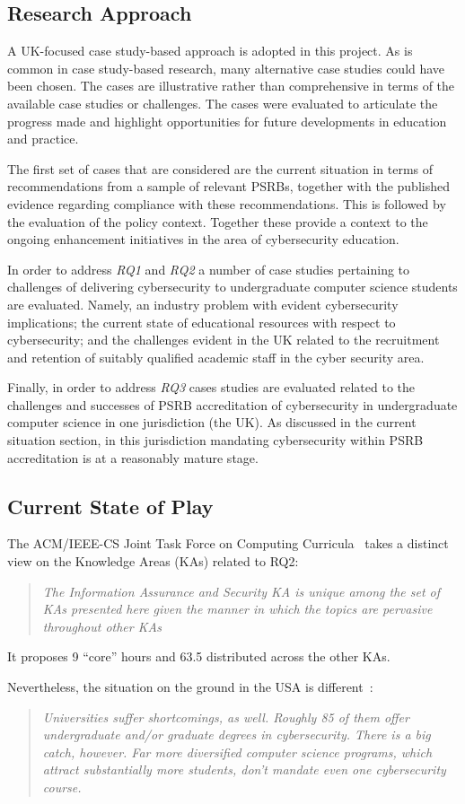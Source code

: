\documentclass[conference]{IEEEtran}
\begin{document}
\subsection{Research Approach}

A UK-focused case study-based approach is adopted in this project. As is common in case study-based research, many alternative case studies could have been chosen. The cases are illustrative rather than comprehensive in terms of the available case studies or challenges. The cases were evaluated to articulate the progress made and highlight opportunities for future developments in education and practice. 

The first set of cases that are considered are the current situation in terms of recommendations from a sample of relevant PSRBs, together with the published evidence regarding compliance with these recommendations. This is followed by the evaluation of the policy context. Together these provide a context to the ongoing enhancement initiatives in the area of cybersecurity education.

In order to address {\emph{RQ1}} and {\emph{RQ2}} a number of case studies pertaining to challenges of delivering cybersecurity to undergraduate computer science students are evaluated. Namely, an industry problem with evident cybersecurity implications; the current state of educational resources with respect to cybersecurity; and the challenges evident in the UK related to the recruitment and retention of suitably qualified academic staff in the cyber security area. 

Finally, in order to address {\emph{RQ3}} cases studies are evaluated related to the challenges and successes of PSRB accreditation of cybersecurity in undergraduate computer science in one jurisdiction (the UK). As discussed in the current situation section, in this jurisdiction mandating cybersecurity within PSRB accreditation is at a reasonably mature stage.

\subsection{Current State of Play}

The ACM/IEEE-CS Joint Task Force on Computing Curricula~\cite[p.~97]{ACM2013a} takes a distinct view on the Knowledge Areas (KAs) related to RQ2:
\begin{quote}
{\emph{The Information Assurance and Security KA is unique among the set of KAs presented here
given the manner in which the topics are pervasive throughout other KAs}}
\end{quote}
It proposes 9 ``core'' hours and 63.5 distributed across the other KAs.
\par
Nevertheless, the situation on the ground in the USA is different~\cite{Ackerman2019a}:
\begin{quote}
{\emph{Universities suffer shortcomings, as well. Roughly 85 of them offer undergraduate and/or graduate degrees in cybersecurity. There is a big catch, however. Far more diversified computer science programs, which attract substantially more students, don't mandate even one cybersecurity course.}}
\end{quote}
\end{document}
